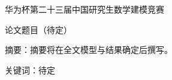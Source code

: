\documentclass[UTF8,a4paper,12pt]{ctexart}
\begin{document}
\songti{}
\thispagestyle{plain}
\begin{center}
  {\heiti 华为杯第二十三届中国研究生数学建模竞赛\par}
  \vspace{1.2em}
  {\heiti 论文题目（待定）\par}
\end{center}
\vspace{1.2em}
\noindent\heiti 摘要：\songti 摘要将在全文模型与结果确定后撰写。\par
\vspace{.8em}
\noindent\heiti 关键词：\songti 待定\par
\clearpage











\appendix
\renewcommand{\thefigure}{A\arabic{figure}}
\setcounter{figure}{0}

\end{document}

